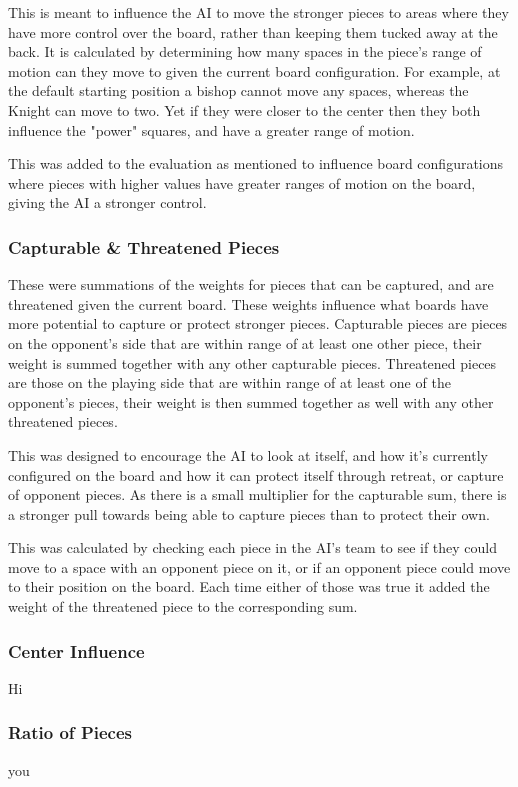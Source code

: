 \documentclass[conference]{IEEEtran}
\begin{document}
This is meant to influence the AI to move the stronger pieces to areas where they have more control over the board, rather than keeping them tucked away at the back. It is calculated by determining how many spaces in the piece's range of motion can they move to given the current board configuration. For example, at the default starting position a bishop cannot move any spaces, whereas the Knight can move to two. Yet if they were closer to the center then they both influence the "power" squares, and have a greater range of motion. 

This was added to the evaluation as mentioned to influence board configurations where pieces with higher values have greater ranges of motion on the board, giving the AI a stronger control. 

\subsubsection{Capturable \& Threatened Pieces}
These were summations of the weights for pieces that can be captured, and are threatened given the current board. These weights influence what boards have more potential to capture or protect stronger pieces. Capturable pieces are pieces on the opponent's side that are within range of at least one other piece, their weight is summed together with any other capturable pieces. Threatened pieces are those on the playing side that are within range of at least one of the opponent's pieces, their weight is then summed together as well with any other threatened pieces. 

This was designed to encourage the AI to look at itself, and how it's currently configured on the board and how it can protect itself through retreat, or capture of opponent pieces. As there is a small multiplier for the capturable sum, there is a stronger pull towards being able to capture pieces than to protect their own. 

This was calculated by checking each piece in the AI's team to see if they could move to a space with an opponent piece on it, or if an opponent piece could move to their position on the board. Each time either of those was true it added the weight of the threatened piece to the corresponding sum. 

\subsubsection{Center Influence}
Hi
\subsubsection{Ratio of Pieces}
you
\end{document}
